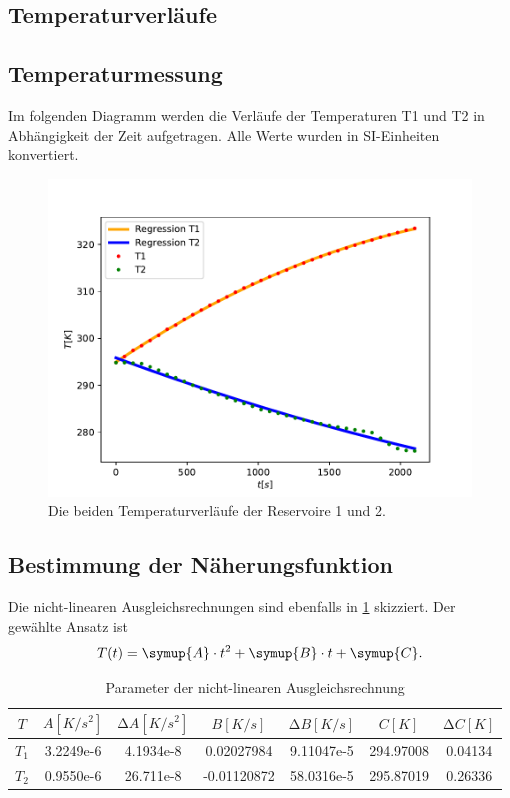 \subsection{Temperaturverläufe}
\subsection{Temperaturmessung}
Im folgenden Diagramm werden die Verläufe der Temperaturen T1 und T2 in Abhängigkeit der Zeit aufgetragen.
Alle Werte wurden in SI-Einheiten konvertiert.
\begin{figure}
  \centering
  \includegraphics[scale = 0.75]{Temperaturverlaeufe.pdf}
  \caption{Die beiden Temperaturverläufe der Reservoire 1 und 2.}
  \label{fig:TemperaturverlaufA}
\end{figure}

\subsection{Bestimmung der Näherungsfunktion}
Die nicht-linearen Ausgleichsrechnungen sind ebenfalls in \ref{fig:TemperaturverlaufA} skizziert. Der gewählte Ansatz ist
\begin{equation}
  T(t) = \symup{A} \cdot t^2 + \symup{B} \cdot t + \symup{C}.
  \label{eq:Regressionsgleichung}
\end{equation}
\begin{table}
  \centering
  \caption{Parameter der nicht-linearen Ausgleichsrechnung}
  \label{tab:regression1}
  \begin{tabular}{c S S S S S S}
    \toprule
     {$T$} & {$A [K/s^2]$} & {$\increment A [K/s^2]$} & {$B [K/s]$} & {$\increment B [K/s]$} & {$C [K]$} & {$\increment C [K]$} \\
    \midrule
    {$T_\text{1}$} & 3.2249e-6 &  4.1934e-8 &  0.02027984 & 9.11047e-5 & 294.97008 & 0.04134 \\
    {$T_\text{2}$} & 0.9550e-6 &  26.711e-8 & -0.01120872 & 58.0316e-5 & 295.87019 & 0.26336 \\
    \bottomrule
  \end{tabular}
\end{table}


